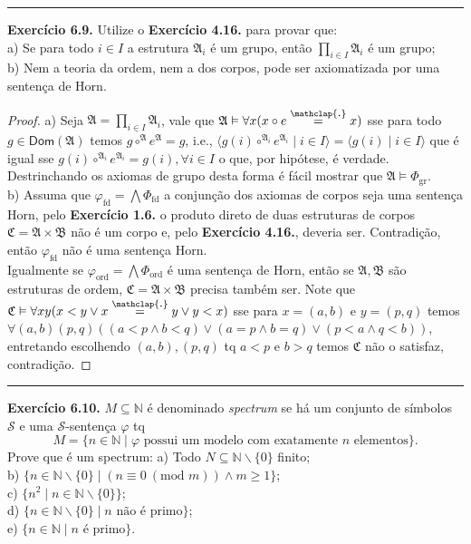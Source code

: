 \documentclass[11pt]{article}
\newcommand{\mc}[1]{\mathcal{#1}}
\newcommand{\mf}[1]{\mathfrak{#1}}
\newcommand{\msf}[1]{\mathsf{#1}}
\newcommand{\mbb}[1]{\mathbb{#1}}
\newcommand\overtext[2]{\stackrel{\mathclap{\normalfont\mbox{#1}}}{#2}}
\begin{document}
\hrule

\begin{shaded}
\textbf{Exercício 6.9.} Utilize o \textbf{Exercício 4.16.} para provar que:\\
a) Se para todo $i\in I$ a estrutura $\mf{A}_i$ é um grupo, então $\prod_{i\in I}\mf{A}_i$ é um grupo;\\
b) Nem a teoria da ordem, nem a dos corpos, pode ser axiomatizada por uma sentença de Horn.
\end{shaded}

\begin{proof}
    a) Seja $\mf{A}=\prod_{i\in I}\mf{A}_i$, vale que $\mf{A}\vDash\forall x(x\circ e\overtext{.}{=}x)$ sse para todo $g\in\msf{Dom}(\mf{A})$ temos $g\circ^\mf{A}e^\mf{A}=g$, i.e., $\langle g(i)\circ^{\mf{A}_i}e^{\mf{A}_i}\mid i\in I\rangle=\langle g(i)\mid i\in I\rangle$ que é igual sse $g(i)\circ^{\mf{A}_i}e^{\mf{A}_i}=g(i),\forall i\in I$ o que, por hipótese, é verdade. Destrinchando os axiomas de grupo desta forma é fácil mostrar que $\mf{A}\vDash\Phi_\text{gr}$.\\
    b) Assuma que $\varphi_\text{fd}=\bigwedge\Phi_\text{fd}$ a conjunção dos axiomas de corpos seja uma sentença Horn, pelo \textbf{Exercício 1.6.} o produto direto de duas estruturas de corpos $\mf{C}=\mf{A}\times\mf{B}$ não é um corpo e, pelo \textbf{Exercício 4.16.}, deveria ser. Contradição, então $\varphi_\text{fd}$ não é uma sentença Horn.\\
    Igualmente se $\varphi_\text{ord}=\bigwedge\Phi_\text{ord}$ é uma sentença de Horn, então se $\mf{A},\mf{B}$ são estruturas de ordem, $\mf{C}=\mf{A}\times\mf{B}$ precisa também ser. Note que $\mf{C}\vDash\forall xy(x<y\vee x\overtext{.}{=}y\vee y<x)$ sse para $x=(a,b)$ e $y=(p,q)$ temos $\forall(a,b)(p,q)((a<p\wedge b<q)\vee(a=p\wedge b=q)\vee(p<a\wedge q<b))$, entretando escolhendo $(a,b),(p,q)$ tq $a<p$ e $b>q$ temos $\mf{C}$ não o satisfaz, contradição.
\end{proof}

\hrule

\begin{shaded}
\textbf{Exercício 6.10.} $M\subseteq\mbb{N}$ é denominado \textit{spectrum} se há um conjunto de símbolos $\mc{S}$ e uma $\mc{S}$-sentença $\varphi$ tq
$$M=\{n\in\mbb{N}\mid\varphi\text{ possui um modelo com exatamente }n\text{ elementos}\}.$$
Prove que é um spectrum: a) Todo $N\subseteq\mbb{N}\backslash\{0\}$ finito;\\
b) $\{n\in\mbb{N}\backslash\{0\}\mid(n\equiv 0~(\text{mod }m))\wedge m\ge1\}$;\\
c) $\{n^2\mid n\in\mbb{N}\backslash\{0\}\}$;\\
d) $\{n\in\mbb{N}\backslash\{0\}\mid n\text{ não é primo}\}$;\\
e) $\{n\in\mbb{N}\mid n\text{ é primo}\}$.
\end{shaded}
\end{document}
